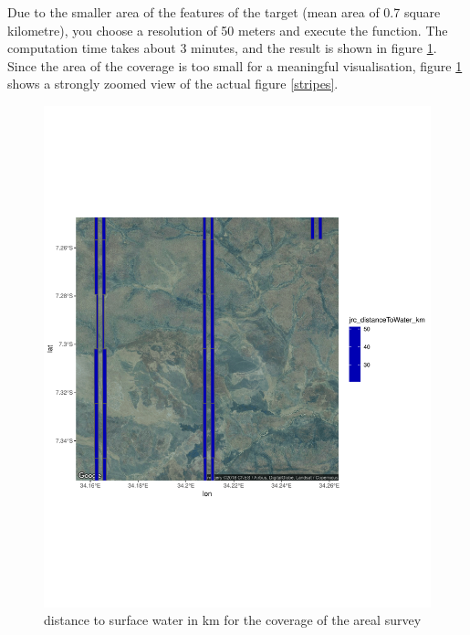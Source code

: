 Due to the smaller area of the features of the target (mean area of 0.7 square kilometre), you choose a resolution of 50 meters and execute the function. The computation time takes about 3 minutes, and the result is shown in figure \ref{session_2}. Since the area of the coverage is too small for a meaningful visualisation, figure \ref{session_2} shows a strongly zoomed view of the actual figure \ref{stripes}. 



\begin{center}
	\begin{figure}[h]
		\begin{center}
			\includegraphics[width=15cm]{images/stripes_distance_zoom.pdf}
			\caption{distance to surface water in km for the coverage of the areal survey}
			\label{session_2}
		\end{center}
	\end{figure}
\end{center}




